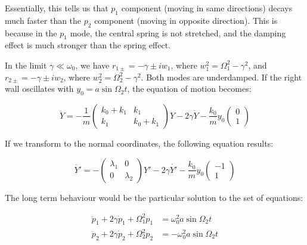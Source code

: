 \documentclass[12pt]{article}
\begin{document}
Essentially, this tells us that $p_{1}$ component (moving in same directions) decays much faster than the $p_{2}$ component (moving in opposite direction). This is because in the $p_{1}$ mode, the central spring is not stretched, and the damping effect is much stronger than the spring effect.

In the limit $\gamma \ll \omega_{0}$, we have $r_{1\pm} = -\gamma \pm iw_{1}$, where $w_{1}^{2} = \Omega_{1}^{2} - \gamma^{2}$, and $r_{2\pm} = -\gamma \pm iw_{2}$, where $w_{2}^{2} = \Omega_{2}^{2} - \gamma^{2}$. Both modes are underdamped. If the right wall oscillates with $y_{0} = a \sin{\Omega_{2}t}$, the equation of motion becomes:

\begin{equation}
    \ddot{Y} =
    -\frac{1}{m}
    \begin{pmatrix}
        k_{0} + k_{1} & k_{1}         \\
        k_{1}         & k_{0} + k_{1}
    \end{pmatrix}
    Y
    -2\gamma
    \dot{Y}
    -
    \frac{k_{0}}{m}y_{0}
    \begin{pmatrix}
        0 \\
        1
    \end{pmatrix}
\end{equation}

If we transform to the normal coordinates, the following equation results:

\begin{equation}
    \ddot{Y'} =
    -\begin{pmatrix}
        \lambda_{1} & 0           \\
        0           & \lambda_{2}
    \end{pmatrix}
    Y'
    -2\gamma
    \dot{Y'}
    -
    \frac{k_{0}}{m}y_{0}
    \begin{pmatrix}
        -1 \\
        1
    \end{pmatrix}
\end{equation}

The long term behaviour would be the particular solution to the set of equations:

\begin{equation}
    \begin{split}
        \ddot{p}_{1} + 2\gamma \dot{p}_{1} + \Omega_{1}^{2} p_{1} &= \omega_{0}^{2}a \sin{\Omega_{2}t} \\
        \ddot{p}_{2} + 2\gamma \dot{p}_{2} + \Omega_{2}^{2} p_{2} &= -\omega_{0}^{2}a \sin{\Omega_{2}t}
    \end{split}
\end{equation}
\end{document}
